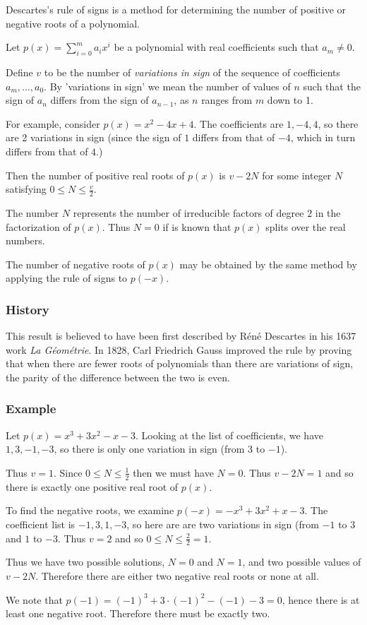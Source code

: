 \documentclass[12pt]{article}
\begin{document}
Descartes's rule of signs is a method for determining the number of positive or negative roots of a polynomial.

Let $p(x) = \sum_{i=0}^m a_ix^i $ be a polynomial with real coefficients such that $a_m \neq 0$.

Define $v$ to be the number of {\it variations in sign} of the sequence of coefficients $a_m, \ldots, a_0$.  By 'variations in sign' we mean the number of values of $n$ such that the sign of $a_n$ differs from the sign of $a_{n - 1}$, as $n$ ranges from $m$ down to 1.

For example, consider $p(x) = x^2 - 4x + 4$.  The coefficients are $1, -4, 4$, so there are 2 variations in sign (since the sign of $1$ differs from that of $-4$, which in turn differs from that of $4$.)

Then the number of positive real roots of $p(x)$ is $v-2N$ for some integer $N$ satisfying $0 \leq N \leq \frac{v}{2}$.

The number $N$ represents the number of irreducible factors of degree $2$ in the factorization of $p(x)$.  Thus $N=0$ if is known that $p(x)$ splits over the real numbers.

The number of negative roots of $p(x)$ may be obtained by the same method by applying the rule of signs to $p(-x)$.

\subsubsection*{History}

This result is believed to have been first described by R\'{e}n\'{e} Descartes in his 1637 work {\it La G\'eom\'etrie}. In 1828, Carl Friedrich Gauss improved the rule by proving that when there are fewer roots of polynomials than there are variations of sign, the parity of the difference between the two is even.

\subsubsection*{Example}

Let $p(x) = x^3+3x^2-x-3$.  Looking at the list of coefficients, we have $1, 3, -1, -3$, so there is only one variation in sign (from $3$ to $-1$).

Thus $v = 1$.  Since $0 \leq N \leq \frac{1}{2}$ then we must have $N=0$.  Thus $v-2N=1$ and so there is exactly one positive real root of $p(x)$.

To find the negative roots, we examine $p(-x) = -x^3+3x^2+x-3$.  The coefficient list is $-1,3,1,-3$, so here are are two variations in sign (from $-1$ to $3$ and $1$ to $-3$.  Thus $v=2$ and so $0 \leq N \leq \frac{2}{2} = 1$.

Thus we have two possible solutions, $N=0$ and $N=1$, and two possible values of $v-2N$.  Therefore there are either two negative real roots or none at all.

We note that $p(-1)=(-1)^3+3 \cdot (-1)^2-(-1)-3=0$, hence there is at least one negative root.  Therefore there must be exactly two.
\end{document}
